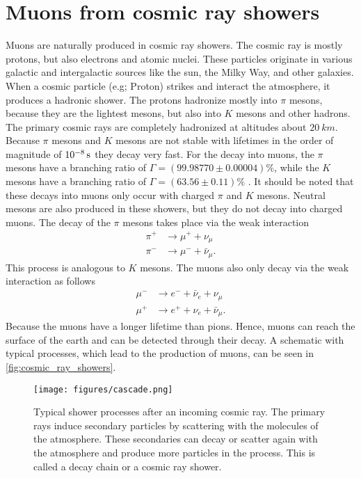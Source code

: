 \section{Muons from cosmic ray showers} 
Muons are naturally produced in cosmic ray showers. 
The cosmic ray is mostly protons, but also electrons and atomic nuclei.
These particles originate in various galactic and intergalactic sources like the sun, the Milky Way, and other galaxies.
When a cosmic particle (e.g; Proton) strikes and interact the atmosphere, it produces a hadronic shower.
The protons hadronize mostly into $\pi$ mesons, because they are the lightest mesons, but also into $K$ mesons and other hadrons.
The primary cosmic rays are completely hadronized at altitudes about $\SI{20}{km}$. 
Because $\pi$ mesons and $K$ mesons are not stable with lifetimes in the order of magnitude of $\SI{e{-8}}{\second}$ they decay very fast. 
For the decay into muons, the $\pi$ mesons have a branching ratio of $\Gamma = (99.98770\pm{0.00004})\%$, while the $K$ mesons have a branching ratio of $\Gamma = (63.56\pm{0.11})\%$ \cite{pdg}.
It should be noted that these decays into muons only occur with charged $\pi$ and $K$ mesons.
Neutral mesons are also produced in these showers, but they do not decay into charged muons.
The decay of the $\pi$ mesons takes place via the weak interaction 
\begin{align*}
    \pi^{+} &\to \mu^{+} + \nu_{\mu} \\
    \pi^{-} &\to \mu^{-} + \bar{\nu}_{\mu}.
\end{align*}
This process is analogous to $K$ mesons.
The muons also only decay via the weak interaction as follows 
\begin{align*}
    \mu^{-} &\to e^{-} + \bar{\nu}_{e} + {\nu}_{\mu} \\
    \mu^{+} &\to e^{+} + \nu_{e} + \bar{\nu}_{\mu}.
\end{align*}
Because the muons have a longer lifetime than pions. Hence, muons can reach the surface of the earth and can be detected through their decay. 
A schematic with typical processes, which lead to the production of muons, can be seen in \autoref{fig:cosmic_ray_showers}.
\begin{figure}
    \centering
    \texttt{[image: figures/cascade.png]}
    \caption{Typical shower processes after an incoming cosmic ray. The primary rays induce secondary particles by scattering with the 
    molecules of the atmosphere. These secondaries can decay or scatter again with the atmosphere and produce more particles in the process. 
    This is called a decay chain or a cosmic ray shower\cite{nasa}.}
    \label{fig:cosmic_ray_showers}
\end{figure}
